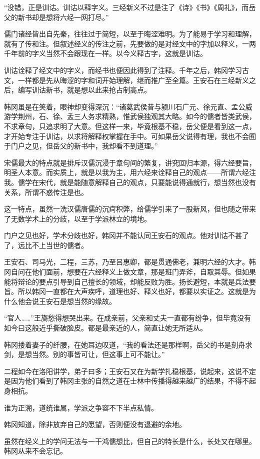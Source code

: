 “没错，正是训诂。训诂以释字义。三经新义不过是注了《诗》《书》《周礼》，而岳父的新书却是想将六经一网打尽。”

儒门诸经皆出自先秦，往往过于简短，以至于晦涩难明。为了能易于学习和理解，就有了传和注。但叙述经义的传注之前，先要做的是对经文中的字加以释义，一两千年前的字义当然不会跟现在一样。以今义释古字，这就是训诂。

训诂诠释了经文中的字义，而经书也便因此得到了注释。千年之后，韩冈学习古文，一样都是先从晦涩的字和词开始理解，继而推广至全篇。王安石在三经新义之后，编写训诂新书，就是想以此来抢占制高点。

韩冈虽是在笑着，眼神却变得深沉：“诸葛武侯昔与颍川石广元、徐元直、孟公威游学荆州，石、徐、孟三人务求精熟，惟武侯独观其大略。如今的儒者皆类武侯，不求章句，只追求明了大意。但这样一来，毕竟根基不稳，岳父便是看到这一点，才开始专注于训诂，以求将解释权掌握在手中。可如果岳父说得有理，我也不会囿于门户之见，但岳父的新书中，我却看不到道理。”

宋儒最大的特点就是排斥汉儒沉浸于章句间的繁复，讲究回归本源，得六经要旨，明圣人本意。而实质上，就是以我为主，用六经来诠释自己的观点——所谓六经注我。儒学在宋代，就是能随意解释自己的观点，只要能说得通就行，想当然也没有关系，所谓不惑传注是也。

这一特点，虽然一洗汉儒唐儒的沉疴积弊，给儒学引来了一股新风，但也随之带来了无数学术上的分歧，以至于学派林立的境地。

门户之见也好，学术分歧也好，韩冈并不能认同王安石的观点。他对训诂不甚了了，远比不上当世的儒者。

王安石、司马光，二程，三苏，乃至吕惠卿，都是贯通佛老，兼明六经的大才。韩冈自问在他们面前，想要在六经释义上做文章，那是班门弄斧，自取其辱。但如果能将辩论的要点引导到自己擅长的领域，却能反败为胜。扬长避短，本就是兵法要旨。所以韩冈一直都在大声疾呼，道理也好、释义也好，都要以实证之。这就是为什么他会说王安石是想当然的缘故。

“官人……”王旖愁得想哭出来。在成亲前，父亲和丈夫一直都有纷争，但毕竟没有如今曰这般近乎撕破脸皮。都是最亲近的人，简直让她无所适从。

韩冈搂着妻子的纤腰，在她耳边叹道，“我的看法还是那样啊，岳父的书是刻舟求剑，是想当然。别的事皆可让，但这事上可不能让。”

二程如今在洛阳讲学，弟子曰多；王安石又在为新学扎稳根基，说起来，这说不定是因为他们看到了韩冈主张的自然之道在士林中传播得越来越广的结果，不得不起身相抗。

谁为正溯，道统谁属，学派之争容不下半点私情。

韩冈知道，除非放弃自己的愿望，否则便没有退避的余地。

虽然在经义上的学问无法与一干鸿儒想比，但自己的特长是什么，长处又在哪里。韩冈从来不会忘记。

